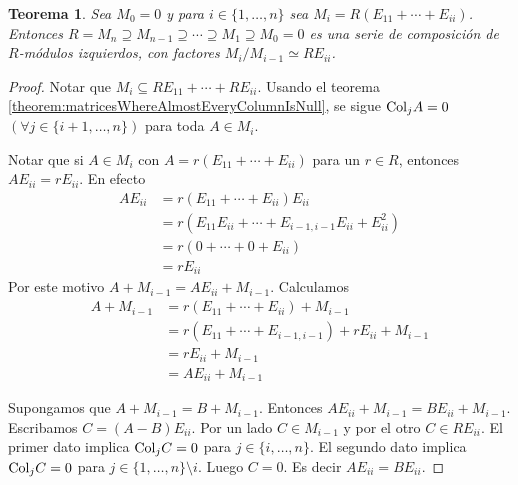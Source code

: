 \documentclass{report}
\newcommand{\Col}{\textnormal{Col}}
\newtheorem{theorem}{Teorema}
\begin{document}
  \begin{theorem}
    \label{theorem:compositionSeriesOfLeftModulesForMatrixRing}
    Sea \(M_0 = 0\) y para \(i \in \{1, \dots, n\}\) sea \(M_i = R (E_{1 1} + \cdots + E_{i i})\).
    Entonces \(R = M_n \supseteq M_{n - 1} \supseteq \cdots \supseteq M_1 \supseteq M_0 = 0\) es una serie de composición de \(R\)-módulos izquierdos, con factores \(M_i / M_{i - 1} \simeq R E_{i i}\).
  \end{theorem}
  \begin{proof}
    Notar que \(M_i \subseteq R E_{1 1} + \cdots + R E_{i i}\).
    Usando el teorema \ref{theorem:matricesWhereAlmostEveryColumnIsNull}, se sigue \(\Col_j A = 0\) \((\forall j \in \{i + 1, \dots, n\})\) para toda \(A \in M_i\).

    Notar que si \(A \in M_i\) con \(A = r (E_{1 1} + \cdots + E_{i i})\) para un \(r \in R\), entonces \(A E_{i i} = r E_{i i}\).
    En efecto
    \begin{align}
      A E_{i i}
      &=
      r (E_{11} + \cdots + E_{i i}) E_{i i}
      \\
      &=
      r (E_{11} E_{i i} + \cdots + E_{i - 1, i - 1} E_{i i} + E_{i i}^2)
      \\
      &=
      r (0 + \cdots + 0 + E_{i i})
      \\
      &=
      r E_{i i}
    \end{align}
    Por este motivo \(A + M_{i - 1} = A E_{i i} + M_{i - 1}\).
    Calculamos
    \begin{align}
      A + M_{i - 1}
      &=
      r (E_{1 1} + \cdots + E_{i i}) + M_{i - 1}
      \\
      &=
      r(E_{1 1} + \cdots + E_{i - 1, i - 1}) + r E_{i i} + M_{i - 1}
      \\
      &=
      r E_{i i} + M_{i - 1}
      \\
      &=
      A E_{i i} + M_{i - 1}
    \end{align}

    Supongamos que \(A + M_{i - 1} = B + M_{i - 1}\).
    Entonces \(A E_{i i} + M_{i - 1} = B E_{i i} + M_{i - 1}\).
    Escribamos \(C = (A - B) E_{i i}\).
    Por un lado \(C \in M_{i - 1}\) y por el otro \(C \in R E_{i i}\).
    El primer dato implica \(\Col_j C = 0\) para \(j \in \{i, \dots, n\}\).
    El segundo dato implica \(\Col_j C = 0\) para \(j \in \{1, \dots, n\} \setminus i\).
    Luego \(C = 0\).
    Es decir \(A E_{i i} = B E_{i i}\).


\end{proof}
\end{document}
